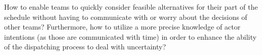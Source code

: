 
How to enable teams to quickly consider feasible alternatives for their part of the schedule 
without having to communicate with or worry about the decisions of other teams?
Furthermore, how to utilize a more precise knowledge of actor intentions (as those are communicated with time)
in order to enhance the ability of the dispatching process to deal with uncertainty?  
